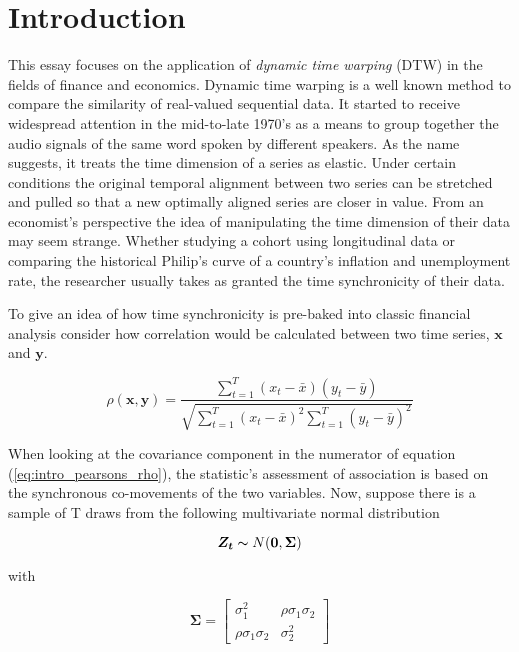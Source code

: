 \documentclass[12pt]{report}
\begin{document}
\chapter{Introduction}

This essay focuses on the application of \textit{dynamic time warping} (DTW) in the fields of finance and economics. Dynamic time warping is a well known method to compare the similarity of real-valued sequential data. It started to receive widespread attention in the mid-to-late 1970's \cite{SakoeChiba_IEEE_1978,Itakura_1975} as a means to group together the audio signals of the same word spoken by different speakers. As the name suggests, it treats the time dimension of a series as elastic. Under certain conditions the original temporal alignment between two series can be stretched and pulled so that a new optimally aligned series are closer in value. From an economist's perspective the idea of manipulating the time dimension of their data may seem strange. Whether studying a cohort using longitudinal data or comparing the historical Philip's curve of a country's inflation and unemployment rate, the researcher usually takes as granted the time synchronicity of their data.

 To give an idea of how time synchronicity is pre-baked into classic financial analysis consider how correlation would be calculated between two time series, $\boldsymbol{x}$ and $\boldsymbol{y}$.

\begin{equation} \label{eq:intro_pearsons_rho}
\rho(\boldsymbol{x}, \boldsymbol{y}) = \frac{ \sum_{t=1}^{T} (x_{t} - \bar{x}) (y_{t} - \bar{y})}{ \sqrt{\sum_{t=1}^{T} (x_{t} - \bar{x})^{2} \sum_{t=1}^{T} (y_{t} - \bar{y})^{2}}}
\end{equation}

When looking at the covariance component in the numerator of equation (\ref{eq:intro_pearsons_rho}), the statistic's assessment of association is based on the synchronous co-movements of the two variables. Now, suppose there is a sample of T draws from the following multivariate normal distribution

\begin{equation}
    \boldsymbol{Z_{t}} \thicksim N(\boldsymbol{0}, \boldsymbol{\Sigma})
\end{equation}

with 

\begin{equation}
    \boldsymbol{\Sigma} = \begin{bmatrix}
        \sigma_{1}^{2}             & \rho \sigma_{1}\sigma_{2} \\
        \rho \sigma_{1} \sigma_{2} & \sigma_{2}^{2} 
    \end{bmatrix}
\end{equation}
\end{document}

